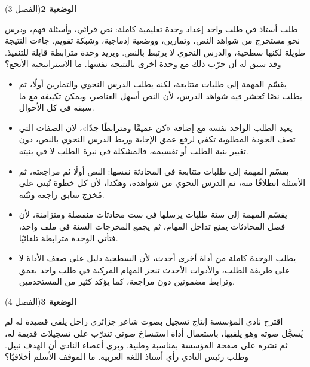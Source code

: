 \documentclass[11pt,a4paper]{article}
\begin{document}
\par\vspace{6pt}
\noindent
{\large\khatt\textbf{الوضعية 2}}\hfill{\small(الفصل 3)}\par\nopagebreak\vspace{3pt}
\setlength{\fboxsep}{7pt}\colorbox{gray!10}{\parbox{\dimexpr\linewidth-14pt}{طلب أستاذ في طلب واحد إعداد وحدة تعليمية كاملة: نص قرائي، وأسئلة فهم، ودرس نحو مستخرج من شواهد النص، وتمارين، ووضعية إدماجية، وشبكة تقويم. جاءت النتيجة طويلة لكنها سطحية، والدرس النحوي لا يرتبط بالنص. ويريد وحدة مترابطة قابلة للتنفيذ. وقد سبق له أن جرّب ذلك مع وحدة أخرى بالنتيجة نفسها. ما الاستراتيجية الأنجع؟}}\par\nopagebreak
\begin{itemize}[leftmargin=1.0cm, labelsep=6pt, itemsep=3pt, topsep=4pt, parsep=0pt]
  \item[\textbf{أ)}] يقسّم المهمة إلى طلبات متتابعة، لكنه يطلب الدرس النحوي والتمارين أولًا، ثم يطلب نصًا تُحشر فيه شواهد الدرس، لأن النص أسهل العناصر، ويمكن تكييفه مع ما سبقه في كل الأحوال.
  \item[\textbf{ب)}] يعيد الطلب الواحد نفسه مع إضافة «كن عميقًا ومترابطًا جدًا»، لأن الصفات التي تصف الجودة المطلوبة تكفي لرفع عمق الإجابة وربط الدرس النحوي بالنص، دون تغيير بنية الطلب أو تقسيمه، فالمشكلة في نبرة الطلب لا في بنيته.
  \item[\textbf{ج)}] يقسّم المهمة إلى طلبات متتابعة في المحادثة نفسها: النص أولًا ثم مراجعته، ثم الأسئلة انطلاقًا منه، ثم الدرس النحوي من شواهده، وهكذا، لأن كل خطوة تُبنى على مُخرَج سابق راجعه وثبّته.
  \item[\textbf{د)}] يقسّم المهمة إلى ستة طلبات يرسلها في ست محادثات منفصلة ومتزامنة، لأن فصل المحادثات يمنع تداخل المهام، ثم يجمع المخرجات الستة في ملف واحد، فتأتي الوحدة مترابطة تلقائيًا.
  \item[\textbf{هـ)}] يطلب الوحدة كاملة من أداة أخرى أحدث، لأن السطحية دليل على ضعف الأداة لا على طريقة الطلب، والأدوات الأحدث تنجز المهام المركبة في طلب واحد بعمق وترابط مضمونين دون مراجعة، كما يؤكد كثير من المستخدمين.
\end{itemize}
\par\vspace{6pt}
\noindent
{\large\khatt\textbf{الوضعية 3}}\hfill{\small(الفصل 4)}\par\nopagebreak\vspace{3pt}
\setlength{\fboxsep}{7pt}\colorbox{gray!10}{\parbox{\dimexpr\linewidth-14pt}{اقترح نادي المؤسسة إنتاج تسجيل بصوت شاعر جزائري راحل يلقي قصيدة له لم يُسجَّل صوته وهو يلقيها، باستعمال أداة استنساخ صوتي تتدرّب على تسجيلات قديمة له، ثم نشره على صفحة المؤسسة بمناسبة وطنية. ويرى أعضاء النادي أن الهدف نبيل. وطلب رئيس النادي رأي أستاذ اللغة العربية. ما الموقف الأسلم أخلاقيًا؟}}\par\nopagebreak
\end{document}
